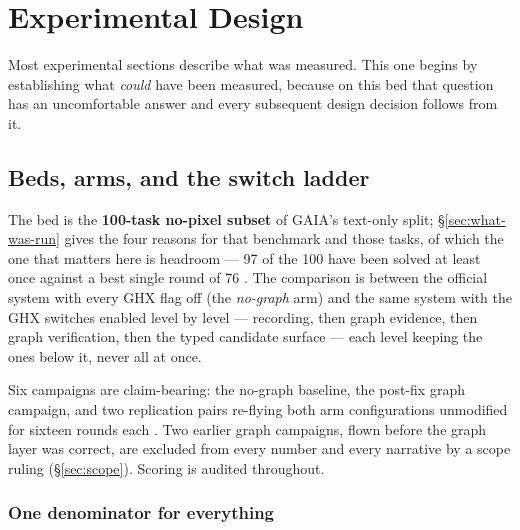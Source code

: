 \chapter{Experimental Design}
\label{ch:design}


Most experimental sections describe what was measured. This one begins by
establishing what \emph{could} have been measured, because on this bed that
question has an uncomfortable answer and every subsequent design decision
follows from it.

\section{Beds, arms, and the switch ladder}
\label{sec:beds}

The bed is the \textbf{100-task no-pixel subset} of GAIA's text-only
split; \S\ref{sec:what-was-run} gives the four reasons for that benchmark
and those tasks, of which the one that matters here is headroom --- 97 of
the 100 have been solved at least once against a best single round of 76
. The comparison is
between the official system with every GHX flag off (the \emph{no-graph}
arm) and the same system with the GHX switches enabled level by level ---
recording, then graph evidence, then graph verification, then the typed
candidate surface --- each level keeping the ones below it, never all at
once.

Six campaigns are claim-bearing: the no-graph baseline, the post-fix graph
campaign, and two replication pairs re-flying both arm configurations
unmodified for sixteen rounds each . Two earlier graph
campaigns, flown before the graph layer was correct, are excluded from
every number and every narrative by a scope ruling (\S\ref{sec:scope}).
Scoring is audited throughout.

\subsection*{One denominator for everything}

